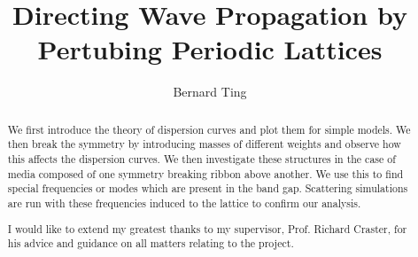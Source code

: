 \documentclass[a4paper, twoside]{report}
\title{Directing Wave Propagation by Pertubing Periodic Lattices}
\author{Bernard Ting}
\begin{document}


\begin{abstract}
We first introduce the theory of dispersion curves and plot them for simple
models. We then break the symmetry by introducing masses of different weights
and observe how this affects the dispersion curves. We then investigate these
structures in the case of media composed of one symmetry breaking ribbon above
another. We use this to find special frequencies or modes which are present in
the band gap. Scattering simulations are run with these frequencies induced to
the lattice to confirm our analysis.
\end{abstract}

\renewcommand{\abstractname}{Acknowledgements}
\begin{abstract}
I would like to extend my greatest thanks to my supervisor, Prof. Richard Craster, for his advice and guidance on all matters relating to the project.
\end{abstract}

\tableofcontents
\listoffigures
\listoftables











\end{document}
